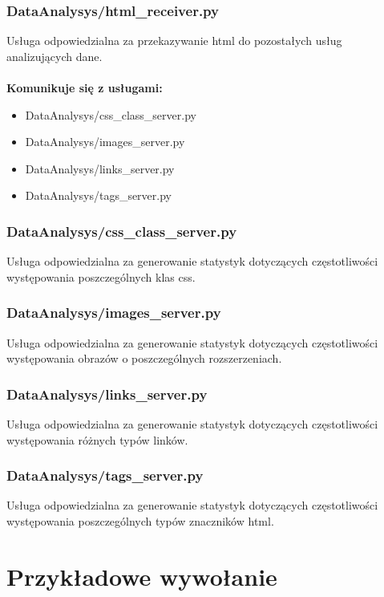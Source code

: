 \documentclass[12pt]{article}
\begin{document}
\subsubsection{DataAnalysys/html\_receiver.py} 
Usługa odpowiedzialna za przekazywanie html do pozostałych usług analizujących dane.
\mbox{}\\\\
\textbf{Komunikuje się z usługami:}\\
\begin{itemize}
\item DataAnalysys/css\_class\_server.py
\item DataAnalysys/images\_server.py
\item DataAnalysys/links\_server.py
\item DataAnalysys/tags\_server.py
\end{itemize} 

\subsubsection{DataAnalysys/css\_class\_server.py} 
Usługa odpowiedzialna za generowanie statystyk dotyczących częstotliwości występowania poszczególnych klas css.

\subsubsection{DataAnalysys/images\_server.py} 
Usługa odpowiedzialna za generowanie statystyk dotyczących częstotliwości występowania obrazów o poszczególnych rozszerzeniach.

\subsubsection{DataAnalysys/links\_server.py} 
Usługa odpowiedzialna za generowanie statystyk dotyczących częstotliwości występowania różnych typów linków.

\subsubsection{DataAnalysys/tags\_server.py} 
Usługa odpowiedzialna za generowanie statystyk dotyczących częstotliwości występowania poszczególnych typów znaczników html.


\section{Przykładowe wywołanie}
\end{document}

